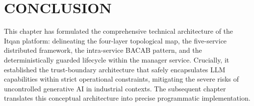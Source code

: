 \section*{CONCLUSION}
This chapter has formulated the comprehensive technical architecture of the Itqan platform: delineating the four-layer topological map, the five-service distributed framework, the intra-service BACAB pattern, and the deterministically guarded lifecycle within the manager service. Crucially, it established the trust-boundary architecture that safely encapsulates LLM capabilities within strict operational constraints, mitigating the severe risks of uncontrolled generative AI in industrial contexts. The subsequent chapter translates this conceptual architecture into precise programmatic implementation.
